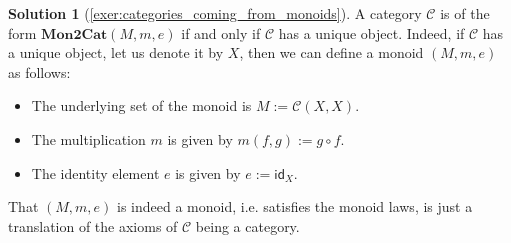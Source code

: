 \documentclass[a4paper,11pt, oneside,titlepage=false]{scrbook}
\theoremstyle{plain}
\theoremstyle{definition}
\newtheorem{solution}[thm]{Solution}
\newcommand{\cfont}[1]{\ensuremath{\mathsf{#1}}}
\newcommand{\Cat}[1]{\mathcal{#1}}
\newcommand{\CC}{\Cat{C}}
\newcommand{\Catb}[1]{\mathbf{#1}}
\newcommand{\POS}{\Catb{Pos}}
\newcommand{\MONtoCAT}{\Catb{Mon2Cat}}
\newcommand{\CHom}[3]{{#1}(#2,#3)}
\newcommand{\Id}[1][]{\cfont{id}_{#1}}
\newcommand{\co}[2]{\ensuremath{#2 \circ #1}}
\newcommand{\NN}{\ensuremath{\mathbb{N}}}
\begin{document}

\begin{solution}[\cref{exer:categories_coming_from_monoids}]\label{sol:categories_coming_from_monoids}
A category $\CC$ is of the form $\MONtoCAT(M,m,e)$ if and only if $\CC$ has a unique object. Indeed, if $\CC$ has a unique object, let us denote it by $X$, then we can define a monoid $(M,m,e)$ as follows:
\begin{itemize}
\item The underlying set of the monoid is $M := \CHom{\CC}{X}{X}$.
\item The multiplication $m$ is given by $m(f,g) := \co{f}{g}$.
\item The identity element $e$ is given by $e := \Id[X]$.
\end{itemize}
That $(M,m,e)$ is indeed a monoid, i.e. satisfies the monoid laws, is just a translation of the axioms of $\CC$ being a category.
\end{solution}
\end{document}
